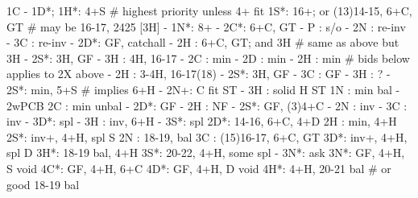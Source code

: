 1C - 1D*;
1H*: 4+S  # highest priority unless 4+ fit
1S*: 16+; or (13)14-15, 6+C, GT  # may be 16-17, 2425 [3H]
   - 1N*: 8+
        - 2C*: 6+C, GT
             - P  : s/o
             - 2N : re-inv
             - 3C : re-inv
        - 2D*: GF, catchall
        - 2H : 6+C, GT; and 3H  # same as above but 3H
        - 2S*: 3H, GF
        - 3H : 4H, 16-17
   - 2C : min
   - 2D : min
   - 2H : min
   # bids below applies to 2X above
        - 2H : 3-4H, 16-17(18)
        - 2S*: 3H, GF
        - 3C : GF
        - 3H : ?
   - 2S*: min, 5+S  # implies 6+H
   - 2N+: C fit ST
   - 3H : solid H ST
1N : min bal
   - 2wPCB
2C : min unbal
   - 2D*: GF
   - 2H : NF
   - 2S*: GF, (3)4+C
   - 2N : inv
   - 3C : inv
   - 3D*: spl
   - 3H : inv, 6+H
   - 3S*: spl
2D*: 14-16, 6+C, 4+D
2H : min, 4+H
2S*: inv+, 4+H, spl S
2N : 18-19, bal
3C : (15)16-17, 6+C, GT
3D*: inv+, 4+H, spl D
3H*: 18-19 bal, 4+H
3S*: 20-22, 4+H, some spl
   - 3N*: ask
3N*: GF, 4+H, S void 
4C*: GF, 4+H, 6+C
4D*: GF, 4+H, D void 
4H*: 4+H, 20-21 bal  # or good 18-19 bal
